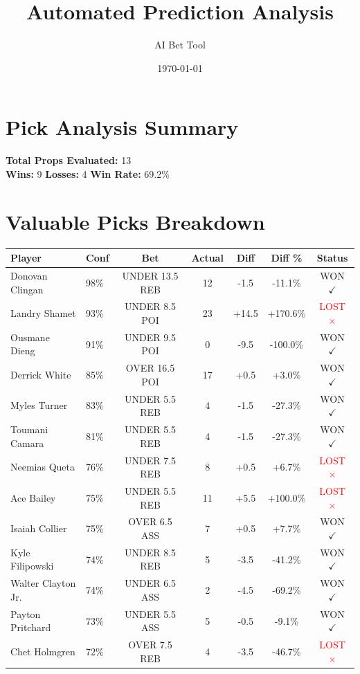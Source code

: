 \documentclass{article}
\title{Automated Prediction Analysis}
\author{AI Bet Tool}
\date{\today}
\begin{document}
\maketitle

\section*{Pick Analysis Summary}
\textbf{Total Props Evaluated:} 13 \\
\textbf{Wins:} 9 \quad \textbf{Losses:} 4 \quad \textbf{Win Rate:} 69.2\%

\section*{Valuable Picks Breakdown}
\begin{table}[h]
\centering
\begin{tabular}{llccccc}
\toprule
\textbf{Player} & \textbf{Conf} & \textbf{Bet} & \textbf{Actual} & \textbf{Diff} & \textbf{Diff \%} & \textbf{Status} \\
\midrule
Donovan Clingan & 98\% & UNDER 13.5 REB & 12 & -1.5 & -11.1\% & \textcolor{green!70!black}{WON $\checkmark$} \\
Landry Shamet & 93\% & UNDER 8.5 POI & 23 & +14.5 & +170.6\% & \textcolor{red}{LOST $\times$} \\
Ousmane Dieng & 91\% & UNDER 9.5 POI & 0 & -9.5 & -100.0\% & \textcolor{green!70!black}{WON $\checkmark$} \\
Derrick White & 85\% & OVER 16.5 POI & 17 & +0.5 & +3.0\% & \textcolor{green!70!black}{WON $\checkmark$} \\
Myles Turner & 83\% & UNDER 5.5 REB & 4 & -1.5 & -27.3\% & \textcolor{green!70!black}{WON $\checkmark$} \\
Toumani Camara & 81\% & UNDER 5.5 REB & 4 & -1.5 & -27.3\% & \textcolor{green!70!black}{WON $\checkmark$} \\
Neemias Queta & 76\% & UNDER 7.5 REB & 8 & +0.5 & +6.7\% & \textcolor{red}{LOST $\times$} \\
Ace Bailey & 75\% & UNDER 5.5 REB & 11 & +5.5 & +100.0\% & \textcolor{red}{LOST $\times$} \\
Isaiah Collier & 75\% & OVER 6.5 ASS & 7 & +0.5 & +7.7\% & \textcolor{green!70!black}{WON $\checkmark$} \\
Kyle Filipowski & 74\% & UNDER 8.5 REB & 5 & -3.5 & -41.2\% & \textcolor{green!70!black}{WON $\checkmark$} \\
Walter Clayton Jr. & 74\% & UNDER 6.5 ASS & 2 & -4.5 & -69.2\% & \textcolor{green!70!black}{WON $\checkmark$} \\
Payton Pritchard & 73\% & UNDER 5.5 ASS & 5 & -0.5 & -9.1\% & \textcolor{green!70!black}{WON $\checkmark$} \\
Chet Holmgren & 72\% & OVER 7.5 REB & 4 & -3.5 & -46.7\% & \textcolor{red}{LOST $\times$} \\
\bottomrule
\end{tabular}
\end{table}
\end{document}
